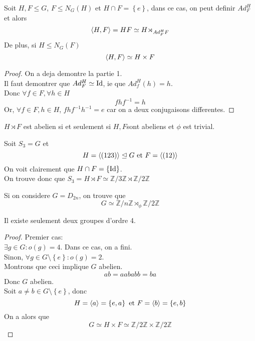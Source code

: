 \documentclass[../main.tex]{subfiles}
\begin{document}
\begin{thm}
	Soit $H,F \leq G$, $F \leq N_G(H ) $ et $H \cap F = \left\{ e  \right\} $, dans ce cas, on peut definir $Ad_{F}^{H}$ et alors
	\[ 
		\left\langle H,F\right\rangle = HF \simeq H \rtimes_{Ad_{F}^{H} F} 
	\]
	De plus, si $H \leq N_G( F) $ 
	\[ 
		\left\langle H,F\right\rangle \simeq H \times F
	\]
	
	
\end{thm}
\begin{proof}

On a deja demontre la partie 1.\\
Il faut demontrer que $Ad_{F}^{H}\simeq \operatorname*{Id}$, ie que $Ad_{f}^{H}( h) = h$.\\
Donc $\forall f \in F, \forall h \in H$ 
\[ 
fhf^{-1} = h
\]
Or, $\forall f \in F, h \in H$, $fhf^{-1}h^{-1}=e$ car on a deux conjugaisons differentes.
\end{proof}
\begin{rmq}
$H \rtimes F$ est abelien si et seulement si $H,F$sont abeliens et $\phi$ est trivial.
\end{rmq}
\begin{exemple}
	Soit $S_3 = G$ et 
	\[ 
		H = \left\langle ( 123) \right\rangle \trianglelefteq G \text{ et } F = \left\langle ( 12) \right\rangle
	\]
	On voit clairement que $H \cap F = \left\{ \operatorname*{Id} \right\} $. \\
	On trouve donc que $S_3 =H\rtimes F \simeq \mathbb{Z} / 3 \mathbb{Z} \rtimes \mathbb{Z} / 2 \mathbb{Z} $

\end{exemple}
\begin{exemple}
Si on considere $G= D_{2n} $, on trouve
 que 
 \[ 
 G \simeq \mathbb{Z} / n \mathbb{Z} \rtimes_\phi \mathbb{Z} / 2 \mathbb{Z}
 \]
 
\end{exemple}
\begin{propo}
Il existe seulement deux groupes d'ordre 4.
\end{propo}
\begin{proof}
Premier cas:\\
$\exists g \in G: o( g) = 4$. Dans ce cas, on a fini.\\
Sinon, $\forall g \in G \setminus \left\{ e   \right\}: o( g) =2 $.\\
Montrons que ceci implique $G$ abelien.
\[ 
ab = aababb = ba
\]
Donc $G$ abelien.\\
Soit $a \neq b \in G \setminus \left\{ e \right\} $, donc
\[ 
	H = \left\langle a\right\rangle = \left\{ e,a \right\} \text{ et } F = \left\langle b\right\rangle = \left\{ e,b \right\} 
\]
On a alors que
\[ 
G \simeq H \times F \simeq \mathbb{Z} /2\mathbb{Z} \times \mathbb{Z}/2\mathbb{Z}
\]

\end{proof}
\end{document}
